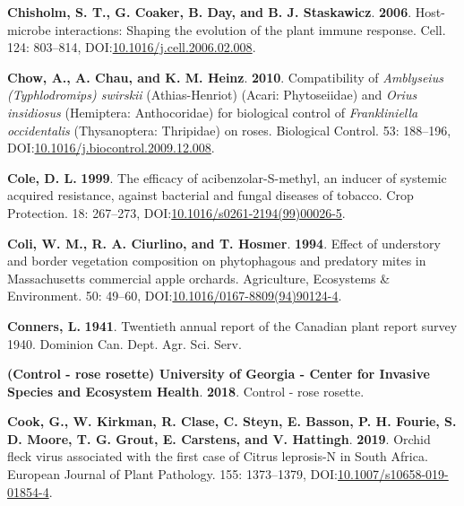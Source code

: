 \documentclass[12pt,final,CPage]{ufthesis}
\newlength{\cslhangindent}
\newenvironment{CSLReferences}[2] %
{%
	\setlength{\parindent}{0pt}
	\ifodd #1 \everypar{\setlength{\hangindent}{\cslhangindent}}\ignorespaces\fi
	\ifnum #2 > 0
	\setlength{\parskip}{#2\baselineskip}
	\fi
}%
{}
\begin{document}
{\begin{CSLReferences}{1}{0}
  \leavevmode{}%
  \textbf{Chisholm, S. T., G. Coaker, B. Day, and B. J. Staskawicz}. \textbf{2006}. Host-microbe interactions: Shaping the evolution of the plant immune response. Cell. 124: 803--814, DOI:\href{https://doi.org/10.1016/j.cell.2006.02.008}{10.1016/j.cell.2006.02.008}.

  \leavevmode{}%
  \textbf{Chow, A., A. Chau, and K. M. Heinz}. \textbf{2010}. Compatibility of {\emph{Amblyseius (Typhlodromips) swirskii}} ({Athias-Henriot}) ({Acari: Phytoseiidae}) and {\emph{Orius insidiosus}} ({Hemiptera}: {Anthocoridae}) for biological control of {\emph{Frankliniella occidentalis}} ({Thysanoptera:} {Thripidae}) on roses. Biological Control. 53: 188--196, DOI:\href{https://doi.org/10.1016/j.biocontrol.2009.12.008}{10.1016/j.biocontrol.2009.12.008}.

  \leavevmode{}%
  \textbf{Cole, D. L.} \textbf{1999}. The efficacy of acibenzolar-{S}-methyl, an inducer of systemic acquired resistance, against bacterial and fungal diseases of tobacco. Crop Protection. 18: 267--273, DOI:\href{https://doi.org/10.1016/s0261-2194(99)00026-5}{10.1016/s0261-2194(99)00026-5}.

  \leavevmode{}%
  \textbf{Coli, W. M., R. A. Ciurlino, and T. Hosmer}. \textbf{1994}. Effect of understory and border vegetation composition on phytophagous and predatory mites in {Massachusetts} commercial apple orchards. Agriculture, Ecosystems {\&} Environment. 50: 49--60, DOI:\href{https://doi.org/10.1016/0167-8809(94)90124-4}{10.1016/0167-8809(94)90124-4}.

  \leavevmode{}%
  \textbf{Conners, L.} \textbf{1941}. Twentieth annual report of the {Canadian} plant report survey 1940. Dominion Can. Dept. Agr. Sci. Serv.

  \leavevmode{}%
  \textbf{(Control - rose rosette) University of Georgia - Center for Invasive Species and Ecosystem Health}. \textbf{2018}. Control - rose rosette.

  \leavevmode{}%
  \textbf{Cook, G., W. Kirkman, R. Clase, C. Steyn, E. Basson, P. H. Fourie, S. D. Moore, T. G. Grout, E. Carstens, and V. Hattingh}. \textbf{2019}. {Orchid fleck virus} associated with the first case of {Citrus leprosis}-{N} in {South Africa}. European Journal of Plant Pathology. 155: 1373--1379, DOI:\href{https://doi.org/10.1007/s10658-019-01854-4}{10.1007/s10658-019-01854-4}.


\end{CSLReferences}}
\end{document}
